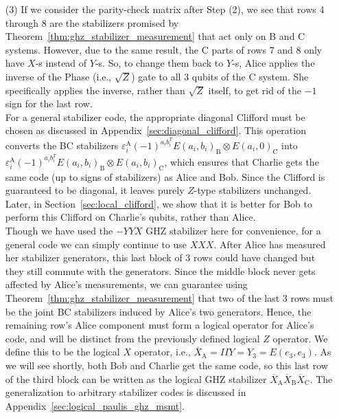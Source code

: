 \documentclass[journal,onecolumn]{IEEEtran}
\begin{document}
\begin{enumerate}
\item[(3)] If we consider the parity-check matrix after Step (2), we see that rows 4 through 8 are the stabilizers promised by Theorem~\ref{thm:ghz_stabilizer_measurement} that act only on B and C systems.
However, due to the same result, the C parts of rows 7 and 8 only have $X$-s instead of $Y$-s.
So, to change them back to $Y$-s, Alice applies the inverse of the Phase (i.e., $\sqrt{Z}$) gate to all $3$ qubits of the C system.
She specifically applies the inverse, rather than $\sqrt{Z}$ itself, to get rid of the $-1$ sign for the last row. \\

For a general stabilizer code, the appropriate diagonal Clifford must be chosen as discussed in Appendix~\ref{sec:diagonal_clifford}.
This operation converts the BC stabilizers $\varepsilon_i^{\text{A}} (-1)^{a_ib_i^T} E(a_i,b_i)_{\text{B}} \otimes E(a_i,0)_{\text{C}}$ into $\varepsilon_i^{\text{A}} (-1)^{a_ib_i^T} E(a_i,b_i)_{\text{B}} \otimes E(a_i,b_i)_{\text{C}}$, which ensures that Charlie gets the same code (up to signs of stabilizers) as Alice and Bob.
Since the Clifford is guaranteed to be diagonal, it leaves purely $Z$-type stabilizers unchanged.
Later, in Section~\ref{sec:local_clifford}, we show that it is better for Bob to perform this Clifford on Charlie's qubits, rather than Alice. \\

Though we have used the $-YYX$ GHZ stabilizer here for convenience, for a general code we can simply continue to use $XXX$.
After Alice has measured her stabilizer generators, this last block of 3 rows could have changed but they still commute with the generators.
Since the middle block never gets affected by Alice's measurements, we can guarantee using Theorem~\ref{thm:ghz_stabilizer_measurement} that two of the last 3 rows must be the joint BC stabilizers induced by Alice's two generators.
Hence, the remaining row's Alice component must form a logical operator for Alice's code, and will be distinct from the previously defined logical $Z$ operator.
We define this to be the logical $X$ operator, i.e., $\overline{X}_{\text{A}} = IIY = Y_3 = E(e_3,e_3)$.
As we will see shortly, both Bob and Charlie get the same code, so this last row of the third block can be written as the logical GHZ stabilizer $\overline{X}_{\text{A}} \overline{X}_{\text{B}} \overline{X}_{\text{C}}$.
The generalization to arbitrary stabilizer codes is discussed in Appendix~\ref{sec:logical_paulis_ghz_msmt}. \\


\end{enumerate}
\end{document}
